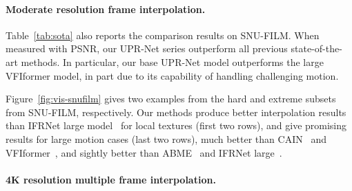 \documentclass[10pt,twocolumn,letterpaper]{article}
\begin{document}
\paragraph{Moderate resolution frame interpolation.}
Table~\ref{tab:sota} also reports the comparison results on SNU-FILM.  When
measured with PSNR, our UPR-Net series outperform all previous state-of-the-art
methods. In particular, our base UPR-Net model outperforms the large VFIformer
model, in part due to its capability of handling challenging motion.



Figure~\ref{fig:vis-snufilm} gives two examples from the hard  and extreme
subsets from SNU-FILM, respectively. Our methods produce better interpolation
results than IFRNet large model~\cite{kong2022ifrnet} for local textures (first
two rows), and give promising results for large motion cases (last two rows),
much better than CAIN~\cite{choi2020channel} and VFIformer~\cite{lu2022video},
and sightly better than ABME~\cite{park2021asymmetric} and IFRNet
large~\cite{kong2022ifrnet}.




\paragraph{4K resolution multiple frame interpolation.}
\end{document}
